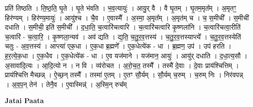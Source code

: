 \documentclass[17pt]{extarticle}
\begin{document}
प्रति॑ तिष्ठति । ति॒ष्ठ॒ति॒ घृ॒ते । घृ॒ते भ॑वति । भ॒व॒त्यायुः॑ । आयु॒र् वै । वै घृ॒तम् । घृ॒तम॒मृत᳚म् । अ॒मृतꣳ॒॒ हिर॑ण्यम् । हिर॑ण्य॒मायुः॑ । आयु॑श्च । चै॒व । ए॒वास्मै᳚ । अ॒स्मा॒ अ॒मृत᳚म् । अ॒मृत॑म् च । च॒ स॒मीची᳚ । स॒मीची॑ दधाति । स॒मीची॒ इति॑ स॒मीची᳚ । द॒धा॒ति॒ च॒त्वारि॑चत्वारि । च॒त्वारि॑चत्वारि कृ॒ष्णला॑नि । च॒त्वारि॑चत्वा॒रीति॑ च॒त्वारि॑ - च॒त्वा॒रि॒ । कृ॒ष्णला॒न्यव॑ । अव॑ द्यति । द्य॒ति॒ च॒तु॒र॒व॒त्तस्य॑ । च॒तु॒र॒व॒त्तस्याप्त्ये᳚ । च॒तु॒र॒व॒त्तस्येति॑ चतुः - अ॒व॒त्तस्य॑ । आप्त्या॑ एक॒धा । ए॒क॒धा ब्र॒ह्मणे᳚ । ए॒क॒धेत्ये॑क - धा । ब्र॒ह्मण॒ उप॑ । उप॑ हरति । ह॒र॒त्ये॒क॒धा । ए॒क॒धैव । ए॒क॒धेत्ये॑क - धा । ए॒व यज॑माने । यज॑मान॒ आयुः॑ । आयु॑र् दधाति । द॒धा॒त्य॒सौ । अ॒सावा॑दि॒त्यः । आ॒दि॒त्यो न । न वि । व्य॑रोचत । अ॒रो॒च॒त॒ तस्मै᳚ । तस्मै॑ दे॒वाः । दे॒वाः प्राय॑श्चित्तिम् । प्राय॑श्चित्ति मैच्छन्न् । ऐ॒च्छ॒न् तस्मै᳚ । तस्मा॑ ए॒तम् । ए॒तꣳ सौ॒र्यम् । सौ॒र्यम् च॒रुम् । च॒रुम् निः । निर॑वपन्न् । अ॒व॒प॒न् तेन॑ । तेनै॒व । ए॒वास्मिन्न्॑ । अ॒स्मि॒न् रुच᳚म् \newline

\textbf{Jatai Paata} \newline
\end{document}
